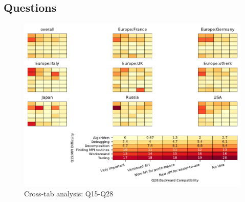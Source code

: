 
\subsection{Questions}


\begin{figure}
\begin{center}
\includegraphics[width=12cm]{../pdfs/Q15-Q28.pdf}
\caption{Cross-tab analysis: Q15-Q28}
\label{fig:Q15-Q28}
\end{center}
\end{figure}
